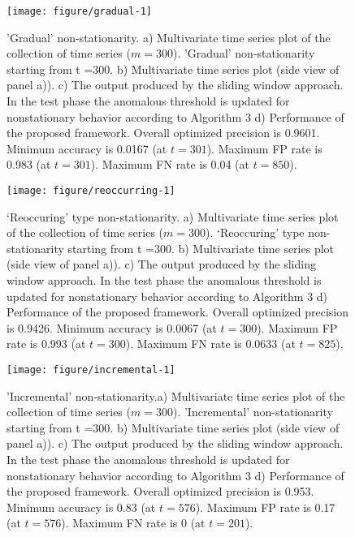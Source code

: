 \documentclass[12pt]{article}
\begin{document}
\begin{figure}[!tbp]

{\centering \texttt{[image: figure/gradual-1]} 

}

\caption{'Gradual' non-stationarity.  a) Multivariate time series plot of the collection of time series ($m = 300$). 'Gradual' non-stationarity starting from t =300.  b) Multivariate time series plot (side view of panel a)). c) The output produced by the sliding window approach. In the test phase the anomalous threshold is updated for nonstationary behavior according to Algorithm 3  d) Performance of the proposed framework. Overall optimized precision is 0.9601.  Minimum accuracy is 0.0167 (at $t = 301$). Maximum FP rate is 0.983 (at $t=301$). Maximum FN rate is 0.04 (at $t=850$). }\label{fig:gradual}
\end{figure}

\begin{figure}[!tbp]

{\centering \texttt{[image: figure/reoccurring-1]} 

}

\caption{`Reoccuring' type non-stationarity. a) Multivariate time series plot of the collection of time series ($m = 300$). `Reoccuring' type non-stationarity starting from t =300.  b) Multivariate time series plot (side view of panel a)). c) The output produced by the sliding window approach. In the test phase the anomalous threshold is updated for nonstationary behavior according to Algorithm 3  d) Performance of the proposed framework. Overall optimized precision is 0.9426. Minimum accuracy is 0.0067 (at $t = 300$). Maximum FP rate is 0.993 (at $t=300$). Maximum FN rate is 0.0633 (at $t=825$). }\label{fig:reoccurring}
\end{figure}

\begin{figure}[!tbp]

{\centering \texttt{[image: figure/incremental-1]} 

}

\caption{ 'Incremental' non-stationarity.a) Multivariate time series plot of the collection of time series ($m = 300$). 'Incremental' non-stationarity starting from t =300.  b) Multivariate time series plot (side view of panel a)). c) The output produced by the sliding window approach. In the test phase the anomalous threshold is updated for nonstationary behavior according to Algorithm 3  d) Performance of the proposed framework. Overall optimized precision is 0.953.  Minimum accuracy is 0.83 (at $t = 576$). Maximum FP rate is 0.17 (at $t=576$). Maximum FN rate is 0 (at $t=201$).}\label{fig:incremental}
\end{figure}
\end{document}
